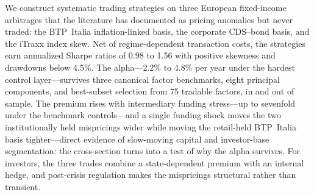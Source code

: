We construct systematic trading strategies on three European fixed-income
arbitrages that the literature has documented as pricing anomalies but never
traded: the BTP~Italia inflation-linked basis, the corporate CDS--bond basis,
and the iTraxx index skew. Net of regime-dependent transaction costs, the
strategies earn annualized Sharpe ratios of 0.98 to 1.56 with positive skewness
and drawdowns below 4.5\%. The alpha---2.2\% to 4.8\% per year under the hardest control layer---survives
three canonical factor benchmarks, eight principal components, and best-subset
selection from 75 tradable factors, in and out of sample. The premium rises with
intermediary funding stress---up to sevenfold under the benchmark
controls---and a single funding shock moves the two institutionally held
mispricings wider while moving the retail-held BTP~Italia basis
tighter---direct evidence of slow-moving capital and investor-base
segmentation: the cross-section turns into a test of why the alpha survives.
For investors, the three trades combine a state-dependent premium
with an internal hedge, and post-crisis regulation makes the mispricings
structural rather than transient.
